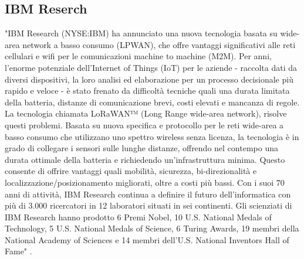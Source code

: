 \documentclass[a4paper]{report} %
\begin{document}
\subsection{IBM Reserch}
"IBM Research (NYSE:IBM) ha annunciato una nuova tecnologia basata su wide-area network a basso consumo (LPWAN), che offre vantaggi significativi alle reti cellulari e wifi per le comunicazioni machine to machine (M2M). Per anni, l'enorme potenziale dell’Internet of Things (IoT) per le aziende - raccolta dati da diversi dispositivi, la loro analisi ed elaborazione per un processo decisionale più rapido e veloce - è stato frenato da difficoltà tecniche quali una durata limitata della batteria, distanze di comunicazione brevi, costi elevati e mancanza di regole. La tecnologia chiamata LoRaWAN™ (Long Range wide-area network), risolve questi problemi. Basata su nuova specifica e protocollo per le reti wide-area a basso consumo che utilizzano uno spettro wireless senza licenza, la tecnologia è in grado di collegare i sensori sulle lunghe distanze, offrendo nel contempo una durata ottimale della batteria e richiedendo un'infrastruttura minima. Questo consente di offrire vantaggi quali mobilità, sicurezza, bi-direzionalità e localizzazione/posizionamento migliorati, oltre a costi più bassi.
Con i suoi 70 anni di attività, IBM Research continua a definire il futuro dell'informatica con più di 3.000 ricercatori in 12 laboratori situati in sei continenti. Gli scienziati di IBM Research hanno prodotto 6 Premi Nobel, 10 U.S. National Medals of Technology, 5 U.S. National Medals of Science, 6 Turing Awards, 19 membri della National Academy of Sciences e 14 membri dell'U.S. National Inventors Hall of Fame" \cite{art:rif.25, art:rif.26}.
\end{document}
